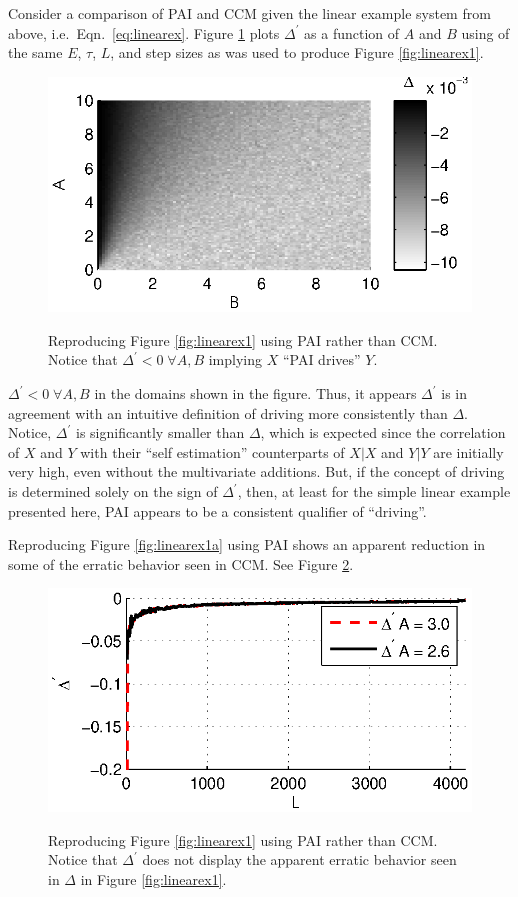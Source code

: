 \documentclass[a4paper,11pt,twocolumn]{article}
\begin{document}
Consider a comparison of PAI and CCM given the linear example system from above, i.e.\ Eqn.\ \ref{eq:linearex}.  Figure \ref{fig:linearExPAI} plots $\Delta^\prime$ as a function of $A$ and $B$ using of the same $E$, $\tau$, $L$, and step sizes as was used to produce Figure \ref{fig:linearex1}.
\begin{figure}[ht]
\includegraphics[scale=0.9]{LinearExPAI.eps} \\
\caption{Reproducing Figure \ref{fig:linearex1} using PAI rather than CCM.  Notice that $\Delta^\prime<0\;\forall A,B$ implying $X$ ``PAI drives'' $Y$.}
\label{fig:linearExPAI}
\end{figure}
$\Delta^\prime<0\;\forall A,B$ in the domains shown in the figure.  Thus, it appears $\Delta^\prime$ is in agreement with an intuitive definition of driving more consistently than $\Delta$.  Notice, $\Delta^\prime$ is significantly smaller than $\Delta$, which is expected since the correlation of $X$ and $Y$ with their ``self estimation'' counterparts of $X|X$ and $Y|Y$ are initially very high, even without the multivariate additions.  But, if the concept of driving is determined solely on the sign of $\Delta^\prime$, then, at least for the simple linear example presented here, PAI appears to be a consistent qualifier of ``driving''.

Reproducing Figure \ref{fig:linearex1a} using PAI shows an apparent reduction in some of the erratic behavior seen in CCM.  See Figure \ref{fig:linearExPAIa}.
\begin{figure}[ht]
\includegraphics[scale=0.9]{LinearExPAIChangeL.eps} \\
\caption{Reproducing Figure \ref{fig:linearex1} using PAI rather than CCM.  Notice that $\Delta^\prime$ does not display the apparent erratic behavior seen in $\Delta$ in Figure \ref{fig:linearex1}.}
\label{fig:linearExPAIa}
\end{figure}
\end{document}
